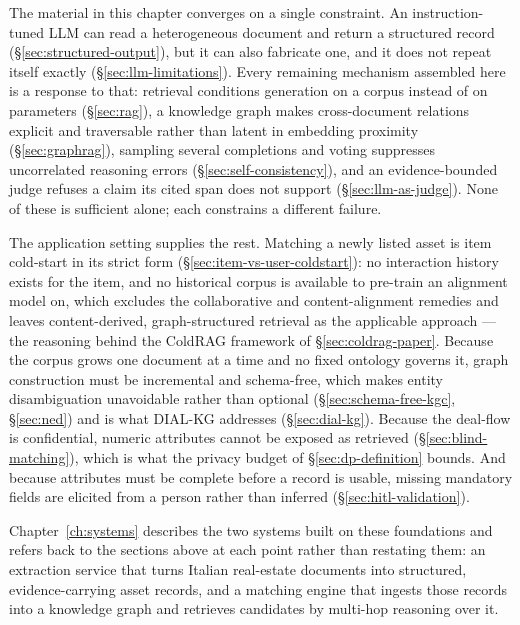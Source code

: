 The material in this chapter converges on a single constraint. An instruction-tuned LLM can read a heterogeneous document and return a structured record (\S\ref{sec:structured-output}), but it can also fabricate one, and it does not repeat itself exactly (\S\ref{sec:llm-limitations}). Every remaining mechanism assembled here is a response to that: retrieval conditions generation on a corpus instead of on parameters (\S\ref{sec:rag}), a knowledge graph makes cross-document relations explicit and traversable rather than latent in embedding proximity (\S\ref{sec:graphrag}), sampling several completions and voting suppresses uncorrelated reasoning errors (\S\ref{sec:self-consistency}), and an evidence-bounded judge refuses a claim its cited span does not support (\S\ref{sec:llm-as-judge}). None of these is sufficient alone; each constrains a different failure.

The application setting supplies the rest. Matching a newly listed asset is item cold-start in its strict form (\S\ref{sec:item-vs-user-coldstart}): no interaction history exists for the item, and no historical corpus is available to pre-train an alignment model on, which excludes the collaborative and content-alignment remedies and leaves content-derived, graph-structured retrieval as the applicable approach --- the reasoning behind the ColdRAG framework of \S\ref{sec:coldrag-paper}. Because the corpus grows one document at a time and no fixed ontology governs it, graph construction must be incremental and schema-free, which makes entity disambiguation unavoidable rather than optional (\S\ref{sec:schema-free-kgc}, \S\ref{sec:ned}) and is what DIAL-KG addresses (\S\ref{sec:dial-kg}). Because the deal-flow is confidential, numeric attributes cannot be exposed as retrieved (\S\ref{sec:blind-matching}), which is what the privacy budget of \S\ref{sec:dp-definition} bounds. And because attributes must be complete before a record is usable, missing mandatory fields are elicited from a person rather than inferred (\S\ref{sec:hitl-validation}).

Chapter~\ref{ch:systems} describes the two systems built on these foundations and refers back to the sections above at each point rather than restating them: an extraction service that turns Italian real-estate documents into structured, evidence-carrying asset records, and a matching engine that ingests those records into a knowledge graph and retrieves candidates by multi-hop reasoning over it.
